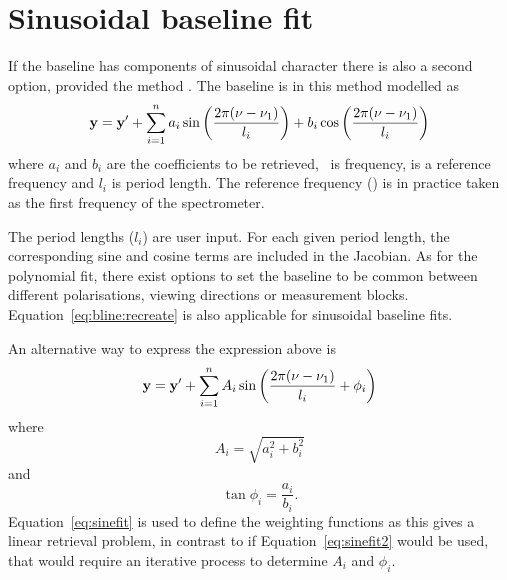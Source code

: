 \section{Sinusoidal baseline fit}
\label{sec:wfuns:sinefit}

If the baseline has components of sinusoidal character there is also a second
option, provided the method . The baseline is
in this method modelled as \citep{kuntz:97}
\begin{equation}
  \label{eq:sinefit}
  \mathbf{y} = \mathbf{y}' + \sum_{i=1}^n 
       a_i\sin\left(\frac{2\pi(\nu-\nu_{1})}{l_i}\right)+
       b_i\cos\left(\frac{2\pi(\nu-\nu_{1})}{l_i}\right)
\end{equation}
where $a_i$ and $b_i$ are the coefficients to be retrieved, \Frq\ is frequency,
 is a reference frequency and $l_i$ is period length. The reference
frequency () is in practice taken as the first frequency of the
spectrometer. 

The period lengths ($l_i$) are user input. For each given period length, the
corresponding sine and cosine terms are included in the Jacobian. As for the
polynomial fit, there exist options to set the baseline to be common between
different polarisations, viewing directions or measurement blocks.
Equation~\ref{eq:bline:recreate} is also applicable for sinusoidal baseline
fits.

An alternative way to express the expression above is
\begin{equation}
  \label{eq:sinefit2}
  \mathbf{y} = \mathbf{y}' + \sum_{i=1}^n A_i
             \sin\left(\frac{2\pi(\nu-\nu_{1})}{l_i} + \phi_i\right)
\end{equation}
where
\begin{equation}
  A_i = \sqrt{a_i^2+b_i^2}
\end{equation}
and
\begin{equation}
  \tan{\phi_i} = \frac{a_i}{b_i}.
\end{equation}
Equation~\ref{eq:sinefit} is used to define the weighting functions as this
gives a linear retrieval problem, in contrast to if Equation~\ref{eq:sinefit2}
would be used, that would require an iterative process to determine $A_i$
and $\phi_i$.

